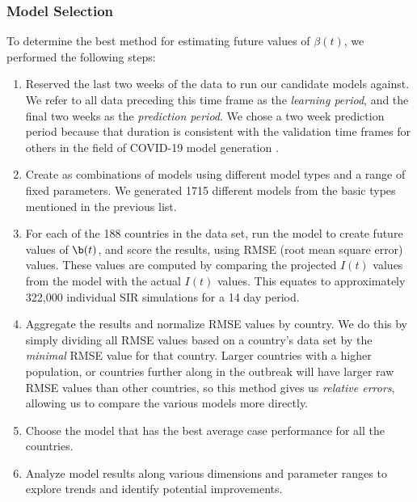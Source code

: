 \documentclass[11pt]{article}
\begin{document}
\subsubsection{Model Selection}
To determine the best method for estimating future values of $\beta(t)$, we performed the following steps:
\begin{enumerate}
    \item Reserved the last two weeks of the data to run our candidate models against. We refer to all data preceding this time frame as the \textit{learning period}, and the final two weeks as the \textit{prediction period}. We chose a two week prediction period because that duration is consistent with the validation time frames for others in the field of COVID-19 model generation \cite{latest-models}. 
    \item Create as combinations of models using different model types and a range of fixed parameters. We generated  1715 different models from the basic types mentioned in the previous list.
    \item For each of the 188 countries in the data set, run the model to create future values of $\b(t)$, and score the results, using RMSE (root mean square error) values. These values are computed by comparing the projected $I(t)$ values from the model with the actual $I(t)$ values. This equates to approximately 322,000 individual SIR simulations for a 14 day period.
    \item Aggregate the results and normalize RMSE values by country. We do this by simply dividing all RMSE values based on a country's data set by the \textit{minimal} RMSE value for that country. Larger countries with a higher population, or countries further along in the outbreak will have larger raw RMSE values than other countries, so this method gives us \textit{relative errors}, allowing us to compare the various models more directly.
    \item Choose the model that has the best average case performance for all the countries.
    \item Analyze model results along various dimensions and parameter ranges to explore trends and identify potential improvements.
\end{enumerate}
\end{document}
